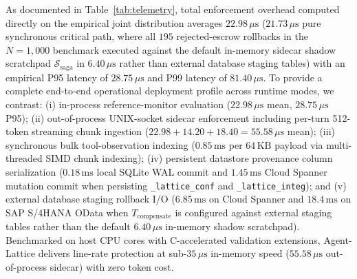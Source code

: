 \documentclass[conference,10pt]{IEEEtran}
\begin{document}
As documented in Table~\ref{tab:telemetry}, total enforcement overhead computed directly on the empirical joint distribution averages $22.98\,\mu\text{s}$ ($21.73\,\mu\text{s}$ pure synchronous critical path, where all $195$ rejected-escrow rollbacks in the $N = 1{,}000$ benchmark executed against the default in-memory sidecar shadow scratchpad $\mathcal{S}_{\text{saga}}$ in $6.40\,\mu\text{s}$ rather than external database staging tables) with an empirical P95 latency of $28.75\,\mu\text{s}$ and P99 latency of $81.40\,\mu\text{s}$. To provide a complete end-to-end operational deployment profile across runtime modes, we contrast: (i) in-process reference-monitor evaluation ($22.98\,\mu\text{s}$ mean, $28.75\,\mu\text{s}$ P95); (ii) out-of-process UNIX-socket sidecar enforcement including per-turn 512-token streaming chunk ingestion ($22.98 + 14.20 + 18.40 = 55.58\,\mu\text{s}$ mean); (iii) synchronous bulk tool-observation indexing ($0.85\,\text{ms}$ per $64\,\text{KB}$ payload via multi-threaded SIMD chunk indexing); (iv) persistent datastore provenance column serialization ($0.18\,\text{ms}$ local SQLite WAL commit and $1.45\,\text{ms}$ Cloud Spanner mutation commit when persisting \texttt{\_lattice\_conf} and \texttt{\_lattice\_integ}); and (v) external database staging rollback I/O ($6.85\,\text{ms}$ on Cloud Spanner and $18.4\,\text{ms}$ on SAP S/4HANA OData when $T_{\text{compensate}}$ is configured against external staging tables rather than the default $6.40\,\mu\text{s}$ in-memory shadow scratchpad). Benchmarked on host CPU cores with C-accelerated validation extensions, Agent-Lattice delivers line-rate protection at sub-$35\,\mu\text{s}$ in-memory speed ($55.58\,\mu\text{s}$ out-of-process sidecar) with zero token cost.
\end{document}
